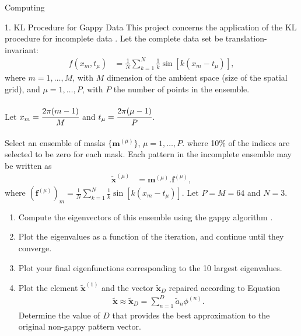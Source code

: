 \begin{section}{Computing}

\begin{homeworkSection}{1. KL Procedure for Gappy Data}
This project concerns the application of the KL procedure for incomplete data \cite{everson}. Let the complete data set be translation-invariant:
\begin{align*}
	f(x_m, t_\mu) &= \frac{1}{N} \sum_{k=1}^N \frac{1}{k} \sin[k(x_m-  t_\mu)],
\end{align*}
where $m = 1,\ldots, M$, with $M$ dimension of the ambient space (size of the spatial grid), and $\mu = 1,\ldots,P$, with $P$ the number of points in the ensemble. 
\\
\\
Let $x_m = \cfrac{2\pi(m-1)}{M}$ and $t_\mu = \cfrac{2\pi(\mu-1)}{P}$.
\\
\\
Select an ensemble of masks $\lbrace \bm{m}^{(\mu)} \rbrace$, $\mu = 1, \ldots, P$. where 10\% of the indices are selected to be zero for each mask. Each pattern in the incomplete ensemble may be written as
\begin{align*}
	\tilde{\bm{x}}^{(\mu)} &= \bm{m}^{(\mu)} . \bm{f}^{(\mu)},
\end{align*}
where $\left ( \bm{f}^{(\mu)} \right )_m = \frac{1}{N} \sum_{k=1}^N \frac{1}{k} \sin[k(x_m-  t_\mu)]$. Let $P=M=64$ and $N=3$.

\renewcommand{\theenumi}{\alph{enumi}}
\begin{enumerate}
  \item Compute the eigenvectors of this ensemble using the gappy algorithm \cite{everson}.
  \item Plot the eigenvalues as a function of the iteration, and continue until they converge.
  \item Plot your final eigenfunctions corresponding to the 10 largest eigenvalues.
  \item Plot the element $\tilde{\bm{x}}^{(1)}$ and the vector $\tilde{\bm{x}}_D$ repaired 	according to Equation
  \begin{align}
  	\tilde{\bm{x}} \approx \tilde{\bm{x}}_D = \sum_{n=1}^D \tilde{a}_n \phi^{(n)}.
  \end{align}
  Determine the value of $D$ that provides the best approximation to the original non-gappy pattern vector.
\end{enumerate}

\end{homeworkSection}
\end{section}
